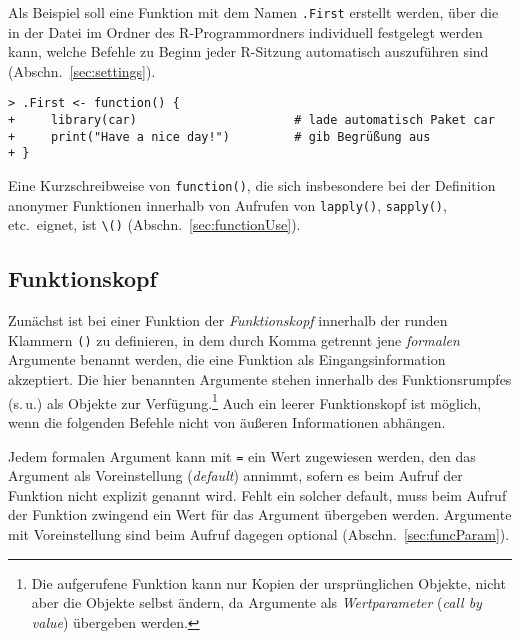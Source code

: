 Als Beispiel soll eine Funktion mit dem Namen \lstinline!.First! erstellt werden, über die in der Datei  im  Ordner des R-Programmordners individuell festgelegt werden kann, welche Befehle zu Beginn jeder R-Sitzung automatisch auszuführen sind (Abschn.\ \ref{sec:settings}).
\begin{lstlisting}
> .First <- function() {
+     library(car)                      # lade automatisch Paket car
+     print("Have a nice day!")         # gib Begrüßung aus
+ }
\end{lstlisting}

Eine Kurzschreibweise von \lstinline!function()!, die sich insbesondere bei der Definition anonymer Funktionen innerhalb von Aufrufen von \lstinline!lapply()!, \lstinline!sapply()!, etc.\ eignet, ist \lstinline!\()! (Abschn.\ \ref{sec:functionUse}). 

\subsection{Funktionskopf}
\label{sec:functionBody}

Zunächst ist bei einer Funktion der \emph{Funktionskopf} innerhalb der runden Klammern \lstinline!()! zu definieren, in dem durch Komma getrennt jene \emph{formalen} Argumente benannt werden, die eine Funktion als Eingangsinformation akzeptiert. Die hier benannten Argumente stehen innerhalb des Funktionsrumpfes (s.\,u.) als Objekte zur Verfügung.\footnote{Die aufgerufene Funktion kann nur Kopien der ursprünglichen Objekte, nicht aber die Objekte selbst ändern, da Argumente als \emph{Wertparameter} (\emph{call by value}) übergeben werden.} Auch ein leerer Funktionskopf ist möglich, wenn die folgenden Befehle nicht von äußeren Informationen abhängen.

Jedem formalen Argument kann mit \lstinline!=! ein Wert zugewiesen werden, den das Argument als Voreinstellung (\emph{default}) annimmt, sofern es beim Aufruf der Funktion nicht explizit genannt wird. Fehlt ein solcher default, muss beim Aufruf der Funktion zwingend ein Wert für das Argument übergeben werden. Argumente mit Voreinstellung sind beim Aufruf dagegen optional (Abschn.\ \ref{sec:funcParam}).

